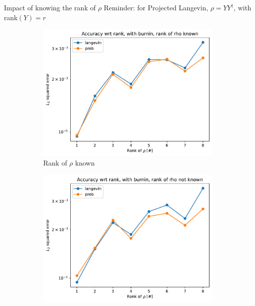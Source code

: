 \documentclass{beamer}
\begin{document}
\begin{frame}{Impact of knowing the rank of $\rho$}
    Reminder: for Projected Langevin, $\rho = YY^\dagger$, with rank$(Y)=r$ 
    \begin{figure}[H]

        \centering
    
        \begin{subfigure}[b]{0.49\textwidth}
    
    
            \centering
    
            \includegraphics[width=\textwidth]{figures/experiments/rank_info/rank_known-1.png}
    
            \caption{Rank of $\rho$ known}
    
            \label{fig:rank-info-sub}
    
        \end{subfigure}
        \hfill
        \begin{subfigure}[b]{0.49\textwidth}
    
    
            \centering
    
            \includegraphics[width=\textwidth]{figures/experiments/rank_info/rank_not_known-1.png}
    

\end{subfigure}
\end{figure}
\end{frame}
\end{document}
